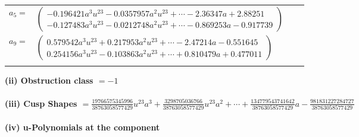 \documentclass[1p]{elsarticle_modified}
\theoremstyle{definition}
\begin{document}
\begin{tabular}{m{7pt} m{180pt} m{7pt} m{180pt} }
\flushright $a_{5}=$&$\begin{pmatrix}-0.196421 a^{3} u^{23}-0.0357957 a^{2} u^{23}+\cdots-2.36347 a+2.88251\\-0.127483 a^{3} u^{23}-0.0212748 a^{2} u^{23}+\cdots-0.869253 a-0.917739\end{pmatrix}$ \\
\flushright $a_{9}=$&$\begin{pmatrix}0.579542 a^{3} u^{23}+0.217953 a^{2} u^{23}+\cdots-2.47214 a-0.551645\\0.254156 a^{3} u^{23}-0.103863 a^{2} u^{23}+\cdots+0.810479 a+0.477011\end{pmatrix}$\\&\end{tabular}
\flushleft \textbf{(ii) Obstruction class $= -1$}\\~\\
\flushleft \textbf{(iii) Cusp Shapes $= \frac{19766575345996}{38763058577429} u^{23} a^3+\frac{3298705036766}{38763058577429} u^{23} a^2+\cdots+\frac{134779543741642}{38763058577429} a-\frac{981831227284727}{38763058577429}$}\\~\\
\newpage\renewcommand{\arraystretch}{1}
\flushleft \textbf{(iv) u-Polynomials at the component}\newline \\
\end{document}
